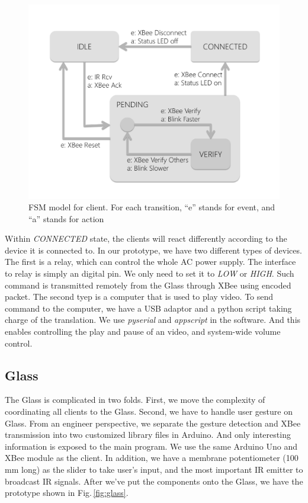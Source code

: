 \begin{figure}
  \centering
  \includegraphics[width=\linewidth]{../figs/clientFSM.pdf}
  \caption{FSM model for client. For each transition, ``e'' stands for event, and ``a'' stands for action}
  \label{fig:clientFSM}
\end{figure}

Within {\it CONNECTED} state, the clients will react differently according to the device it is connected to. In our prototype, we have two different types of devices. The first is a relay, which can control the whole AC power supply. The interface to relay is simply an digital pin. We only need to set it to {\it LOW} or {\it HIGH}. Such command is transmitted remotely from the Glass through XBee using encoded packet. The second tyep is a computer that is used to play video. To send command to the computer, we have a USB adaptor and a python script taking charge of the translation. We use {\it pyserial} and {\it appscript} in the software. And this enables controlling the play and pause of an video, and system-wide volume control.

\subsection{Glass}
\label{sec:glass}

The Glass is complicated in two folds. First, we move the complexity of coordinating all clients to the Glass. Second, we have to handle user gesture on Glass. From an engineer perspective, we separate the gesture detection and XBee transmission into two customized library files in Arduino. And only interesting information is exposed to the main program. We use the same Arduino Uno and XBee module as the client. In addition, we have a membrane potentiometer (100 mm long) as the slider to take user's input, and the most important IR emitter to broadcast IR signals. After we've put the components onto the Glass, we have the prototype shown in Fig.\,\ref{fig:glass}.

